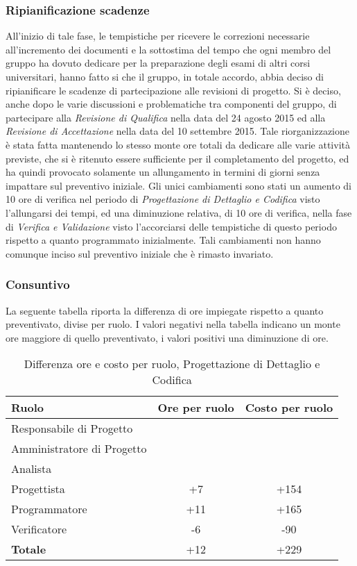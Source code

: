 \subsubsection{Ripianificazione scadenze}
\label{scadenze}
All'inizio di tale fase, le tempistiche per ricevere le correzioni necessarie all'incremento dei documenti e la sottostima del tempo che ogni membro del gruppo ha dovuto dedicare per la preparazione degli esami di altri corsi universitari, hanno fatto si che il gruppo, in totale accordo, abbia deciso di ripianificare le scadenze di partecipazione alle revisioni di progetto. Si è deciso, anche dopo le varie discussioni e problematiche tra componenti del gruppo, di partecipare alla \textit{Revisione di Qualifica} nella data del 24 agosto 2015 ed alla \textit{Revisione di Accettazione} nella data del 10 settembre 2015. Tale riorganizzazione è stata fatta mantenendo lo stesso monte ore totali da dedicare alle varie attività previste, che si è ritenuto essere sufficiente per il completamento del progetto, ed ha quindi provocato solamente un allungamento in termini di giorni senza impattare sul preventivo iniziale. Gli unici cambiamenti sono stati un aumento di 10 ore di verifica nel periodo di \textit{Progettazione di Dettaglio e Codifica} 
visto l'allungarsi dei tempi, ed una diminuzione relativa, di 10 ore di verifica, nella fase di \textit{Verifica e Validazione} visto l'accorciarsi delle tempistiche di questo periodo rispetto a quanto programmato inizialmente. Tali cambiamenti non hanno comunque inciso sul preventivo iniziale che è rimasto invariato.

\subsubsection{Consuntivo}
La seguente tabella riporta la differenza di ore impiegate rispetto a quanto preventivato, divise per ruolo. I valori negativi nella tabella indicano un monte ore maggiore di quello preventivato, i valori positivi una diminuzione di ore.

\begin{table}[h]
	\centering
	\begin{tabular}{|l|c|c|}
		\toprule
		\textbf{Ruolo} & \textbf{Ore per ruolo} & \textbf{Costo per ruolo} \\
		
		\midrule
		Responsabile di Progetto & & \\
		Amministratore di Progetto & & \\ 
		Analista & & \\
		Progettista & +7 & +154 \\
		Programmatore & +11 & +165 \\
		Verificatore & -6 & -90 \\
		\midrule
		\textbf{Totale} & +12 & +229 \\
		
		\bottomrule
	\end{tabular}
	\caption{Differenza ore e costo per ruolo, Progettazione di Dettaglio e Codifica}
	\label{tab6}
\end{table} 

